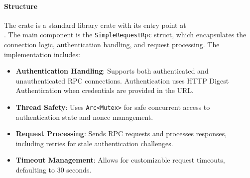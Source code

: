\documentclass[12pt,a4paper]{article}
\begin{document}
\paragraph{Structure}
The crate is a standard library crate with its entry point at \\.  The main component is the \texttt{SimpleRequestRpc} struct, which encapsulates the connection logic, authentication handling, and request processing.  The implementation includes:
\begin{itemize}
    \item \textbf{Authentication Handling}: Supports both authenticated and unauthenticated RPC connections.  Authentication uses HTTP Digest Authentication when credentials are provided in the URL. %
    \item \textbf{Thread Safety}: Uses \texttt{Arc<Mutex>} for safe concurrent access to authentication state and nonce management. %
    \item \textbf{Request Processing}: Sends RPC requests and processes responses, including retries for stale authentication challenges. %
    \item \textbf{Timeout Management}: Allows for customizable request timeouts, defaulting to 30 seconds. %
\end{itemize}
\end{document}

